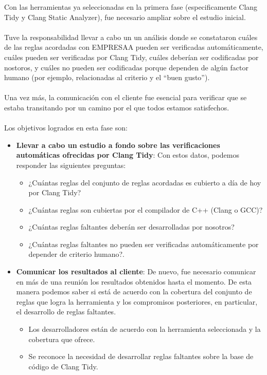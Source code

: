 \documentclass[12pt]{extreport} %
\begin{document}
Con las herramientas ya seleccionadas en la primera fase
(especificamente Clang Tidy y Clang Static Analyzer), fue necesario
ampliar sobre el estudio inicial.

\paragraph{}
Tuve la responsabilidad llevar a cabo un un análisis donde se
constataron cuáles de las reglas acordadas con EMPRESAA pueden ser
verificadas automáticamente, cuáles pueden ser verificadas por Clang
Tidy, cuáles deberían ser codificadas por nostoros, y cuáles no pueden
ser codificadas porque dependen de algún factor humano (por ejemplo,
relacionadas al criterio y el ``buen gusto'').

\paragraph{}
Una vez más, la comunicación con el cliente fue esencial para
verificar que se estaba transitando por un camino por el que todos
estamos satisfechos.

\paragraph{}
Los objetivos logrados en esta fase son:
\begin{itemize}
\item \textbf{Llevar a cabo un estudio a fondo sobre las
  verificaciones automáticas ofrecidas por Clang Tidy}: Con estos
  datos, podemos responder las siguientes preguntas:
  \begin{itemize}
  \item ¿Cuántas reglas del conjunto de reglas acordadas es cubierto a
    día de hoy por Clang Tidy?
  \item ¿Cuántas reglas son cubiertas por el compilador de C++ (Clang o GCC)?
  \item ¿Cuántas reglas faltantes deberán ser desarrolladas por nosotros?
  \item ¿Cuántas reglas faltantes no pueden ser verificadas
    automáticamente por depender de criterio humano?.
  \end{itemize}

\item \textbf{Comunicar los resultados al cliente}: De nuevo, fue
  necesario comunicar en más de una reunión los resultados obtenidos
  hasta el momento. De esta manera podemos saber si está de acuerdo
  con la cobertura del conjunto de reglas que logra la herramienta y
  los compromisos posteriores, en particular, el desarrollo de reglas
  faltantes.
  \begin{itemize}
  \item Los desarrolladores están de acuerdo con la herramienta
    seleccionada y la cobertura que ofrece.
  \item Se reconoce la necesidad de desarrollar reglas faltantes sobre
    la base de código de Clang Tidy.
  \end{itemize}
\end{itemize}
\end{document}
